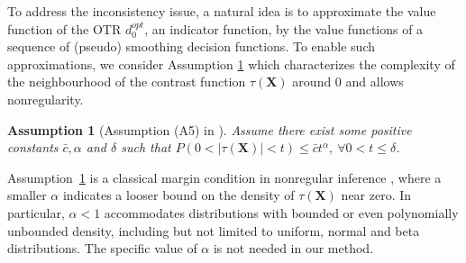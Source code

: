 \documentclass[11pt]{article}
\theoremstyle{referenceplain}
\newtheorem{Assumption}{Assumption}
\theoremstyle{referencedefinition}
\theoremstyle{referenceremark}
\begin{document}
To address the inconsistency issue, a natural idea is to approximate the value function of the OTR $d^{o p t}_0$, an indicator function, by the value functions of a sequence of (pseudo) smoothing decision functions. To enable such approximations, we consider Assumption \ref{A4} which characterizes the complexity of the neighbourhood of the contrast function $\tau(\mathbf{X})$ around 0 and allows nonregularity.
\begin{Assumption}[Assumption (A5) in \citet{shi2020breaking}]\label{A4}
Assume there exist some positive constants $\bar{c}, \alpha$ and $\delta$ such that $P\left(0<\left|\tau\left(\mathbf{X}\right)\right|<t\right) \leq \bar{c} t^\alpha,~\forall 0<t \leq \delta$.
\end{Assumption}
Assumption~\ref{A4} is a classical margin condition in nonregular inference 
\citep{audibert2007fast,luedtke2016statistical,shi2020breaking}, 
where a smaller $\alpha$ indicates a looser bound on the density 
of $\tau(\mathbf{X})$ near zero. In particular, $\alpha<1$ 
accommodates distributions with bounded or even polynomially 
unbounded density, including but not limited to uniform, normal and beta distributions. 
The specific value of $\alpha$ is not needed in our method.
\end{document}

